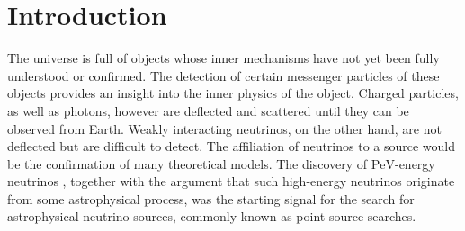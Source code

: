 \chapter{Introduction}
%
%
The universe is full of objects whose inner mechanisms have not yet been fully understood or confirmed.
The detection of certain messenger particles of these objects provides an insight into the inner physics of the object.
Charged particles, as well as photons, however are deflected and scattered until they can be observed from Earth.
Weakly interacting neutrinos, on the other hand, are not deflected but are difficult to detect.
The affiliation of neutrinos to a source would be the confirmation of many theoretical models.
The discovery of $\si{\peta\electronvolt}$-energy neutrinos \cite{pev_neutrino}, together with the argument that such high-energy neutrinos originate from some astrophysical process, was the starting signal for the search for astrophysical neutrino sources, commonly known as point source searches.

